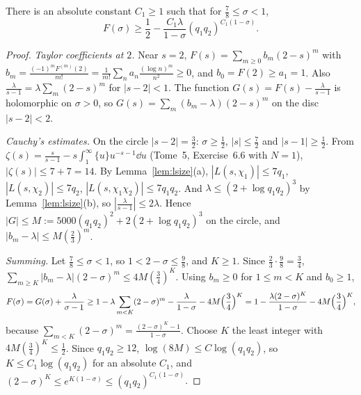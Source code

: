 \begin{lemma}\label{lem:Fbound}
There is an absolute constant $C_1\ge1$ such that for $\frac78\le\sigma<1$,
\[
F(\sigma)\ge\frac12-\frac{C_1\lambda}{1-\sigma}(q_1q_2)^{C_1(1-\sigma)}.
\]
\end{lemma}
\begin{proof}
\emph{Taylor coefficients at $2$.} Near $s=2$, $F(s)=\sum_{m\ge0}b_m(2-s)^m$ with $b_m=\frac{(-1)^mF^{(m)}(2)}{m!}=\frac1{m!}\sum_na_n\frac{(\log n)^m}{n^2}\ge0$, and $b_0=F(2)\ge a_1=1$. Also $\frac\lambda{s-1}=\lambda\sum_m(2-s)^m$ for $|s-2|<1$. The function $G(s)=F(s)-\frac\lambda{s-1}$ is holomorphic on $\sigma>0$, so
$G(s)=\sum_m(b_m-\lambda)(2-s)^m$ on the disc $|s-2|<2$.

\emph{Cauchy's estimates.} On the circle $|s-2|=\frac32$: $\sigma\ge\frac12$, $|s|\le\frac72$ and $|s-1|\ge\frac12$. From $\zeta(s)=\frac s{s-1}-s\int_1^\infty\{u\}u^{-s-1}\dd u$ (Tome~5, Exercise~6.6 with $N=1$), $|\zeta(s)|\le7+7=14$. By Lemma~\ref{lem:lsize}(a), $|L(s,\chi_1)|\le7q_1$, $|L(s,\chi_2)|\le7q_2$, $|L(s,\chi_1\chi_2)|\le7q_1q_2$. And $\lambda\le(2+\log q_1q_2)^3$ by Lemma~\ref{lem:lsize}(b), so $|\frac\lambda{s-1}|\le2\lambda$.
Hence $|G|\le M:=5000(q_1q_2)^2+2(2+\log q_1q_2)^3$ on the circle, and $|b_m-\lambda|\le M(\frac23)^m$.

\emph{Summing.} Let $\frac78\le\sigma<1$, so $1<2-\sigma\le\frac98$, and $K\ge1$. Since $\frac23\cdot\frac98=\frac34$, $\sum_{m\ge K}|b_m-\lambda|(2-\sigma)^m\le4M(\frac34)^K$. Using $b_m\ge0$ for $1\le m<K$ and $b_0\ge1$,
\[
F(\sigma)=G(\sigma)+\frac\lambda{\sigma-1}\ge1-\lambda\sum_{m<K}(2-\sigma)^m-\frac\lambda{1-\sigma}-4M\Bigl(\frac34\Bigr)^K=1-\frac{\lambda(2-\sigma)^K}{1-\sigma}-4M\Bigl(\frac34\Bigr)^K,
\]
because $\sum_{m<K}(2-\sigma)^m=\frac{(2-\sigma)^K-1}{1-\sigma}$. Choose $K$ the least integer with $4M(\frac34)^K\le\frac12$. Since $q_1q_2\ge12$, $\log(8M)\le C\log(q_1q_2)$, so $K\le C_1\log(q_1q_2)$ for an absolute $C_1$, and $(2-\sigma)^K\le e^{K(1-\sigma)}\le(q_1q_2)^{C_1(1-\sigma)}$.
\end{proof}

